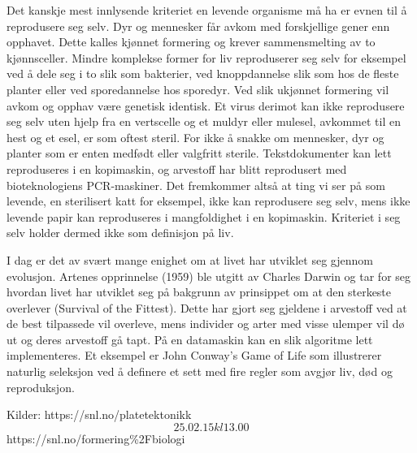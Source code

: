 Det kanskje mest innlysende kriteriet en levende organisme må ha er evnen til å reprodusere seg selv. Dyr og mennesker får avkom med forskjellige gener enn opphavet. Dette kalles kjønnet formering og krever sammensmelting av to kjønnsceller. Mindre komplekse former for liv reproduserer seg selv for eksempel ved å dele seg i to slik som bakterier, ved knoppdannelse slik som hos de fleste planter eller ved sporedannelse hos sporedyr. Ved slik ukjønnet formering vil avkom og opphav være genetisk identisk. Et virus derimot kan ikke reprodusere seg selv uten hjelp fra en vertscelle og et muldyr eller mulesel, avkommet til en hest og et esel, er som oftest steril. For ikke å snakke om mennesker, dyr og planter som er enten medfødt eller valgfritt sterile. Tekstdokumenter kan lett reproduseres i en kopimaskin, og arvestoff har blitt reprodusert med bioteknologiens PCR-maskiner. Det fremkommer altså at ting vi ser på som levende, en sterilisert katt for eksempel, ikke kan reprodusere seg selv, mens ikke levende papir kan reproduseres i mangfoldighet i en kopimaskin. Kriteriet i seg selv holder dermed ikke som definisjon på liv.

I dag er det av svært mange enighet om at livet har utviklet seg gjennom evolusjon. Artenes opprinnelse (1959) ble utgitt av Charles Darwin og tar for seg hvordan livet har utviklet seg på bakgrunn av prinsippet om at den sterkeste overlever (Survival of the Fittest). Dette har gjort seg gjeldene i arvestoff ved at de best tilpassede vil overleve, mens individer og arter med visse ulemper vil dø ut og deres arvestoff gå tapt. På en datamaskin kan en slik algoritme lett implementeres. Et eksempel er John Conway's Game of Life som illustrerer naturlig seleksjon ved å definere et sett med fire regler som avgjør liv, død og reproduksjon. 





Kilder:
https://snl.no/platetektonikk \[25.02.15 kl 13.00\]
https://snl.no/formering\%2Fbiologi